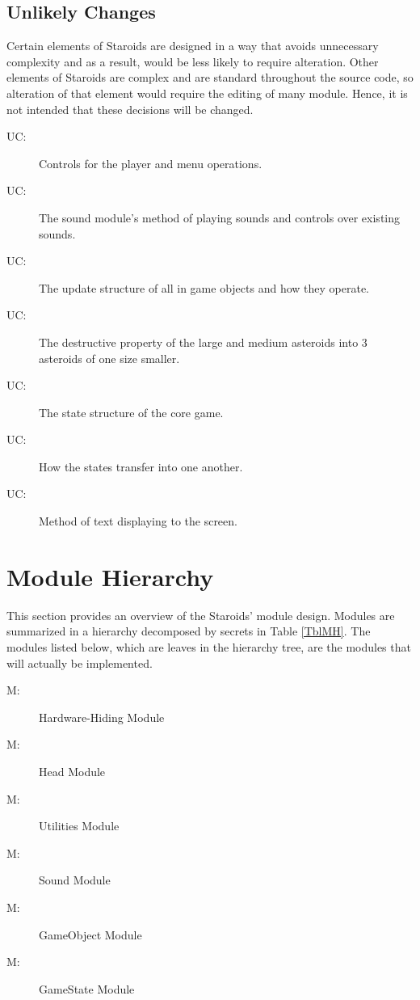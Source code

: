 \documentclass[12pt, titlepage]{article}
\newcounter{ucnum}
\newcommand{\uctheucnum}{UC\theucnum}
\newcounter{mnum}
\newcommand{\mthemnum}{M\themnum}
\begin{document}
\subsection{Unlikely Changes} \label{SecUchange}

Certain elements of Staroids are designed in a way that avoids unnecessary complexity and as a result, would be less likely to require alteration. Other elements of Staroids are complex and are standard throughout the source code, so alteration of that element would require the editing of many module. Hence, it is not intended that these decisions will be changed.

\begin{description}
\item[ \uctheucnum \label{ucUtilities}:] Controls for the player and menu operations.
\item[ \uctheucnum \label{ucSound}:] The sound module's method of playing sounds and controls over existing sounds.
\item[ \uctheucnum \label{ucGameobject}:] The update structure of all in game objects and how they operate.
\item[ \uctheucnum \label{ucGameobject}:] The destructive property of the large and medium asteroids into 3 asteroids of one size smaller.
\item[ \uctheucnum \label{ucGamestate}:] The state structure of the core game.
\item[ \uctheucnum \label{ucGamestate}:] How the states transfer into one another.
\item[ \uctheucnum \label{ucGamestate}:] Method of text displaying to the screen.
\end{description}

\section{Module Hierarchy} \label{SecMH}

This section provides an overview of the Staroids' module design. Modules are summarized
in a hierarchy decomposed by secrets in Table \ref{TblMH}. The modules listed
below, which are leaves in the hierarchy tree, are the modules that will
actually be implemented.

\begin{description}
\item [ \mthemnum \label{mHH}:] Hardware-Hiding Module
\item [ \mthemnum \label{mBHa}:] Head Module
\item [ \mthemnum \label{mBHu}:] Utilities Module
\item [ \mthemnum \label{mBHs}:] Sound Module
\item [ \mthemnum \label{mSDgo}:] GameObject Module
\item [ \mthemnum \label{mSDgs}:] GameState Module
\end{description}
\end{document}
